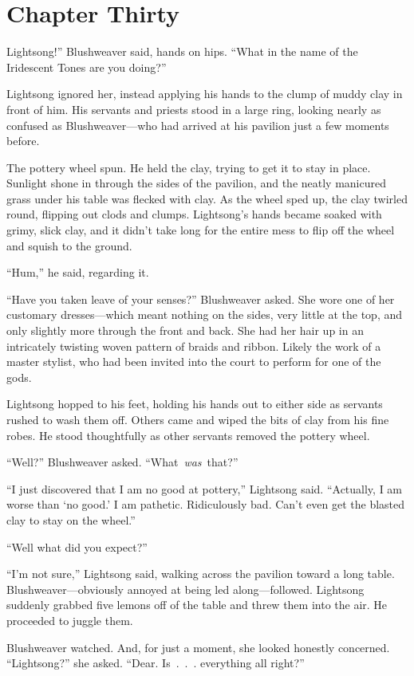 \section{Chapter Thirty}

Lightsong!” Blushweaver said, hands on hips. “What in the name of the Iridescent Tones are you doing?”

Lightsong ignored her, instead applying his hands to the clump of muddy clay in front of him. His servants and priests stood in a large ring, looking nearly as confused as Blushweaver—who had arrived at his pavilion just a few moments before.

The pottery wheel spun. He held the clay, trying to get it to stay in place. Sunlight shone in through the sides of the pavilion, and the neatly manicured grass under his table was flecked with clay. As the wheel sped up, the clay twirled round, flipping out clods and clumps. Lightsong’s hands became soaked with grimy, slick clay, and it didn’t take long for the entire mess to flip off the wheel and squish to the ground.

“Hum,” he said, regarding it.

“Have you taken leave of your senses?” Blushweaver asked. She wore one of her customary dresses—which meant nothing on the sides, very little at the top, and only slightly more through the front and back. She had her hair up in an intricately twisting woven pattern of braids and ribbon. Likely the work of a master stylist, who had been invited into the court to perform for one of the gods.

Lightsong hopped to his feet, holding his hands out to either side as servants rushed to wash them off. Others came and wiped the bits of clay from his fine robes. He stood thoughtfully as other servants removed the pottery wheel.

“Well?” Blushweaver asked. “What~\textit{was}~that?”

“I just discovered that I am no good at pottery,” Lightsong said. “Actually, I am worse than ‘no good.’ I am pathetic. Ridiculously bad. Can’t even get the blasted clay to stay on the wheel.”

“Well what did you expect?”

“I’m not sure,” Lightsong said, walking across the pavilion toward a long table. Blushweaver—obviously annoyed at being led along—followed. Lightsong suddenly grabbed five lemons off of the table and threw them into the air. He proceeded to juggle them.

Blushweaver watched. And, for just a moment, she looked honestly concerned. “Lightsong?” she asked. “Dear. Is~.~.~. everything all right?”

